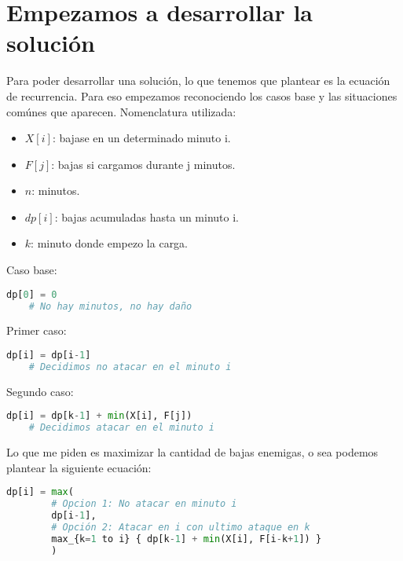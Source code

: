 \section{Empezamos a desarrollar la solución}
Para poder desarrollar una solución, lo que tenemos que plantear es la ecuación de recurrencia. Para eso empezamos reconociendo los casos base y las situaciones comúnes que aparecen.
Nomenclatura utilizada:
\begin{itemize}
\item $X[i]$:  bajase en un determinado minuto i.
\item $F[j]$: bajas si cargamos durante j minutos.
\item $n$: minutos.
\item $dp[i]$: bajas acumuladas hasta un minuto i.
\item $k$: minuto donde empezo la carga.
\end{itemize}
Caso base:
\begin{lstlisting}[language=Python]
    dp[0] = 0  
    # No hay minutos, no hay daño
\end{lstlisting}
Primer caso:
\begin{lstlisting}[language=Python]
    dp[i] = dp[i-1]
    # Decidimos no atacar en el minuto i
\end{lstlisting}
Segundo caso:
\begin{lstlisting}[language=Python]
    dp[i] = dp[k-1] + min(X[i], F[j])
    # Decidimos atacar en el minuto i
\end{lstlisting}
Lo que me piden es maximizar la cantidad de bajas enemigas, o sea podemos plantear la siguiente ecuación:
\begin{lstlisting}[language=Python]
    dp[i] = max(
        # Opcion 1: No atacar en minuto i
        dp[i-1],  
        # Opción 2: Atacar en i con ultimo ataque en k
        max_{k=1 to i} { dp[k-1] + min(X[i], F[i-k+1]) }
        )
\end{lstlisting}



